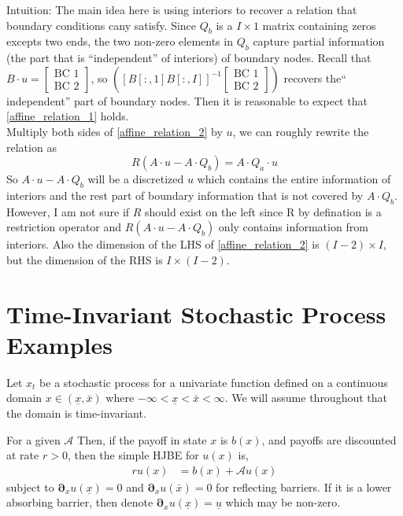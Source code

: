 \documentclass[11pt]{article}
\newcommand{\D}[1][]{\ensuremath{\boldsymbol{\partial}_{#1}}}
\newcommand{\A}{\ensuremath{\mathcal{A}}}
\begin{document}
\begin{itemize}
Intuition: The main idea here is using interiors to recover a relation that boundary conditions cany satisfy. Since $Q_b$ is a $I\times 1$ matrix containing zeros excepts two ends, the two non-zero elements in $Q_b$ capture partial information (the part that is ``independent'' of interiors) of boundary nodes.  Recall that $B\cdot u =\begin{bmatrix}
\text{BC 1}\\
\text{BC 2}
\end{bmatrix} $, so $\left([B[:, 1] B[:, I]]^{-1}\begin{bmatrix}
\text{BC 1}\\
\text{BC 2}
\end{bmatrix}\right)$ recovers the`` independent'' part of boundary nodes. Then it is reasonable to expect that \eqref{affine_relation_1} holds.\\
Multiply both sides of \eqref{affine_relation_2} by $u$, we can roughly rewrite the relation as
\begin{equation}
R(A\cdot u-A\cdot Q_b) = A\cdot Q_a\cdot u
\end{equation}
So $A\cdot u-A\cdot Q_b$ will be a discretized $u$ which contains the entire information of interiors and the rest part of boundary information that is not covered by $A\cdot Q_b$. \\
However, I am not sure if $R$ should exist on the left since R by defination is a restriction operator and $R(A\cdot u-A\cdot Q_b)$ only contains information from interiors. Also the dimension of the LHS of \eqref{affine_relation_2} is $(I-2)\times I$, but the dimension of the RHS is $I\times (I-2)$.
\end{itemize}

\section{Time-Invariant Stochastic Process Examples}
Let $x_t$ be a stochastic process for a univariate function defined on a continuous domain $x \in (\underline{x}, \bar{x})$ where $-\infty < \underline{x} < \bar{x} < \infty$.  We will assume throughout that the domain is time-invariant.

For a given $\A$ Then, if the payoff in state $x$ is $b(x)$, and payoffs are discounted at rate $r > 0$, then the simple HJBE for $u(x)$ is,
\begin{align}
r u(x) &= b(x) + \A u(x)\label{eq:general-stationary-HJBE}
\end{align}
subject to $\D[x]u(\underline{x}) = 0$ and $\D[x]u(\bar{x}) = 0$ for reflecting barriers.  If it is a lower absorbing barrier, then denote $\D[x]u(\underline{x}) = \underline{u}$ which may be non-zero.
\end{document}
